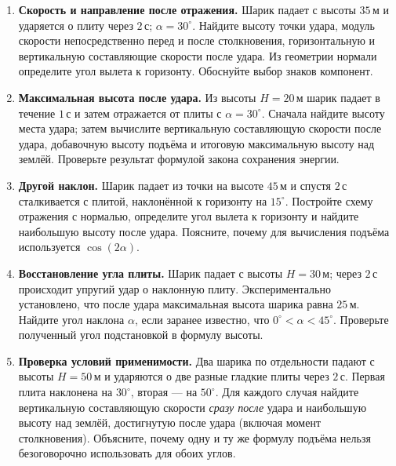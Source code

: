\documentclass[a4paper,12pt]{article}
\begin{document}
\begin{enumerate}[label=\textbf{\arabic*.},start=6,itemsep=11pt]
\item \textbf{Скорость и направление после отражения.} Шарик падает с высоты \(35\,\text{м}\) и ударяется о плиту через \(2\,\text{с}\); \(\alpha=30^\circ\). Найдите высоту точки удара, модуль скорости непосредственно перед и после столкновения, горизонтальную и вертикальную составляющие скорости после удара. Из геометрии нормали определите угол вылета к горизонту. Обоснуйте выбор знаков компонент.
\item \textbf{Максимальная высота после удара.} Из высоты \(H=20\,\text{м}\) шарик падает в течение \(1\,\text{с}\) и затем отражается от плиты с \(\alpha=30^\circ\). Сначала найдите высоту места удара; затем вычислите вертикальную составляющую скорости после удара, добавочную высоту подъёма и итоговую максимальную высоту над землёй. Проверьте результат формулой закона сохранения энергии.
\item \textbf{Другой наклон.} Шарик падает из точки на высоте \(45\,\text{м}\) и спустя \(2\,\text{с}\) сталкивается с плитой, наклонённой к горизонту на \(15^\circ\). Постройте схему отражения с нормалью, определите угол вылета к горизонту и найдите наибольшую высоту после удара. Поясните, почему для вычисления подъёма используется \(\cos(2\alpha)\).
\item \textbf{Восстановление угла плиты.} Шарик падает с высоты \(H=30\,\text{м}\); через \(2\,\text{с}\) происходит упругий удар о наклонную плиту. Экспериментально установлено, что после удара максимальная высота шарика равна \(25\,\text{м}\). Найдите угол наклона \(\alpha\), если заранее известно, что \(0^\circ<\alpha<45^\circ\). Проверьте полученный угол подстановкой в формулу высоты.
\item \textbf{Проверка условий применимости.} Два шарика по отдельности падают с высоты \(H=50\,\text{м}\) и ударяются о две разные гладкие плиты через \(2\,\text{с}\). Первая плита наклонена на \(30^\circ\), вторая --- на \(50^\circ\). Для каждого случая найдите вертикальную составляющую скорости \emph{сразу после} удара и наибольшую высоту над землёй, достигнутую после удара (включая момент столкновения). Объясните, почему одну и ту же формулу подъёма нельзя безоговорочно использовать для обоих углов.
\end{enumerate}
\end{document}
